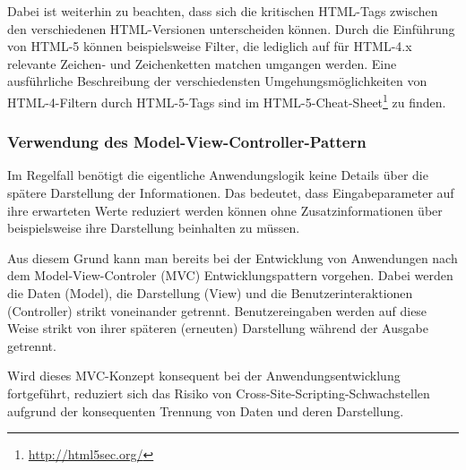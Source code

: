 Dabei ist weiterhin zu beachten, dass sich die kritischen HTML-Tags 
zwischen den verschiedenen HTML-Versionen unterscheiden können. 
Durch die Einführung von HTML-5 können beispielsweise Filter, die 
lediglich auf für HTML-4.x relevante Zeichen- und Zeichenketten 
matchen umgangen werden. Eine ausführliche Beschreibung der 
verschiedensten Umgehungsmöglichkeiten von HTML-4-Filtern durch 
HTML-5-Tags sind im HTML-5-Cheat-Sheet\footnote{\url{http://html5sec.org/}} 
zu finden.

\subsubsection{Verwendung des Model-View-Controller-Pattern}

Im Regelfall benötigt die eigentliche Anwendungslogik keine Details 
über die spätere Darstellung der Informationen. Das bedeutet, dass 
Eingabeparameter auf ihre erwarteten Werte reduziert werden können 
ohne Zusatzinformationen über beispielsweise ihre Darstellung beinhalten 
zu müssen.

Aus diesem Grund kann man bereits bei der Entwicklung von Anwendungen 
nach dem Model-View-Controler (MVC) Entwicklungspattern vorgehen. Dabei 
werden die Daten (Model), die Darstellung (View) und die 
Benutzerinteraktionen (Controller) strikt voneinander getrennt. 
Benutzereingaben werden auf diese Weise strikt von ihrer späteren 
(erneuten) Darstellung während der Ausgabe getrennt.

Wird dieses MVC-Konzept konsequent bei der Anwendungsentwicklung 
fortgeführt, reduziert sich das Risiko von Cross-Site-Scripting-Schwachstellen 
aufgrund der konsequenten Trennung von Daten und deren Darstellung.

